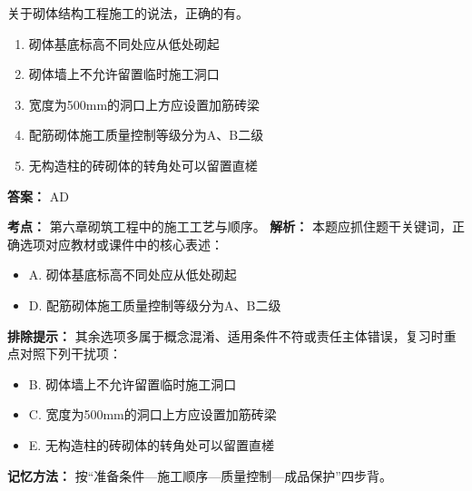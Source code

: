 \documentclass[UTF8,fontset=fandol,11pt]{ctexart}
\begin{document}
\begin{quizbox}[title={第 25 题}]
关于砌体结构工程施工的说法，正确的有。\\
\begin{enumerate}[label=\Alph*.]
\item 砌体基底标高不同处应从低处砌起
\item 砌体墙上不允许留置临时施工洞口
\item 宽度为500mm的洞口上方应设置加筋砖梁
\item 配筋砌体施工质量控制等级分为A、B二级
\item 无构造柱的砖砌体的转角处可以留置直槎
\end{enumerate}
\textbf{答案：} AD
\vspace{0.25em}
\begin{answerbox}[title={考点解析}]
\textbf{考点：} 第六章砌筑工程中的施工工艺与顺序。
\textbf{解析：} 本题应抓住题干关键词，正确选项对应教材或课件中的核心表述：
\begin{itemize}
\item A. 砌体基底标高不同处应从低处砌起
\item D. 配筋砌体施工质量控制等级分为A、B二级
\end{itemize}
\textbf{排除提示：} 其余选项多属于概念混淆、适用条件不符或责任主体错误，复习时重点对照下列干扰项：
\begin{itemize}
\item B. 砌体墙上不允许留置临时施工洞口
\item C. 宽度为500mm的洞口上方应设置加筋砖梁
\item E. 无构造柱的砖砌体的转角处可以留置直槎
\end{itemize}
\textbf{记忆方法：} 按“准备条件—施工顺序—质量控制—成品保护”四步背。
\end{answerbox}
\end{quizbox}
\end{document}
